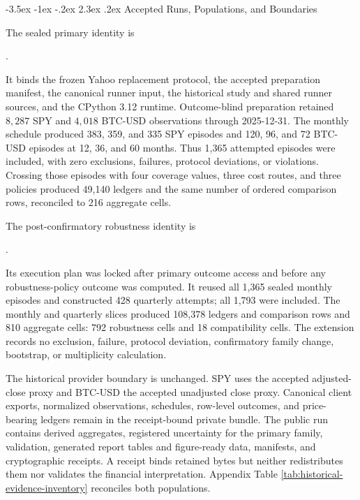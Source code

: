 \documentclass[12pt,a4paper,oneside]{report}
\makeatletter
\renewcommand\section{\@startsection{section}{1}{\z@}%
  {-3.5ex \@plus -1ex \@minus -.2ex}%
  {2.3ex \@plus .2ex}%
  {\normalfont\fontsize{14}{17}\selectfont\bfseries}}
\makeatother
\begin{document}
\section{Accepted Runs, Populations, and Boundaries}
\label{sec:historical-evidence}

The sealed primary identity is

{\scriptsize{}}.

It binds the frozen Yahoo replacement protocol, the accepted preparation
manifest, the canonical runner input, the historical study and shared runner
sources, and the CPython 3.12 runtime. Outcome-blind preparation retained
$8{,}287$ SPY and $4{,}018$ BTC-USD observations through 2025-12-31. The
monthly schedule produced 383, 359, and 335 SPY episodes and 120, 96, and 72
BTC-USD episodes at 12, 36, and 60 months. Thus 1,365 attempted episodes were
included, with zero exclusions, failures, protocol deviations, or violations.
Crossing those episodes with four coverage values, three cost routes, and
three policies produced 49,140 ledgers and the same number of ordered
comparison rows, reconciled to 216 aggregate cells.

The post-confirmatory robustness identity is

{\scriptsize{}}.

Its execution plan was locked after primary outcome access and before any
robustness-policy outcome was computed. It reused all 1,365 sealed monthly
episodes and constructed 428 quarterly attempts; all 1,793 were included.
The monthly and quarterly slices produced 108,378 ledgers and comparison rows
and 810 aggregate cells: 792 robustness cells and 18 compatibility cells. The
extension records no exclusion, failure, protocol deviation, confirmatory
family change, bootstrap, or multiplicity calculation.

The historical provider boundary is unchanged. SPY uses the accepted
adjusted-close proxy and BTC-USD the accepted unadjusted close proxy. Canonical
client exports, normalized observations, schedules, row-level outcomes, and
price-bearing ledgers remain in the receipt-bound private bundle. The public run
contains derived aggregates, registered uncertainty for the primary family,
validation, generated report tables and figure-ready data, manifests, and
cryptographic receipts. A receipt binds retained bytes but neither
redistributes them nor validates the financial interpretation. Appendix Table
\ref{tab:historical-evidence-inventory} reconciles both populations.
\end{document}
